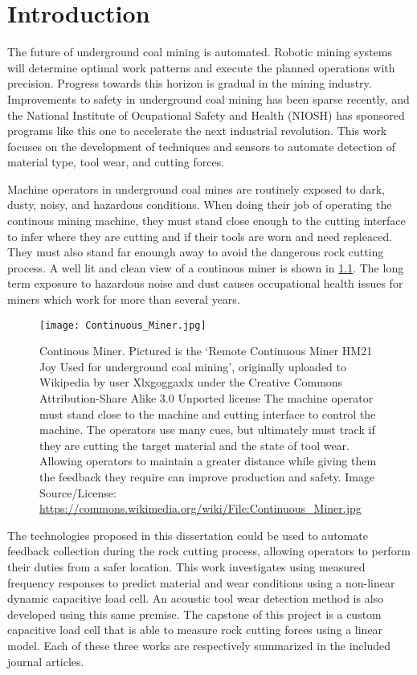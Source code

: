\chapter{Introduction}\label{chap:intro}

The future of underground coal mining is automated. 
Robotic mining systems will determine optimal work patterns and execute
the planned operations with precision.
Progress towards this horizon is gradual in the mining industry.
Improvements to safety in underground coal mining has been sparse recently,
and the National Institute of Ocupational Safety and Health (NIOSH) has sponsored
programs like this one to accelerate the next industrial revolution.
This work focuses on the development of techniques and sensors to automate detection
of material type, tool wear, and cutting forces.

Machine operators in underground coal mines are routinely exposed to dark, dusty, noisy, and
hazardous conditions. When doing their job of operating the continous mining machine,
they must stand close enough to the cutting interface to infer where they are cutting and 
if their tools are worn and need repleaced. They must also stand far enoungh away to avoid
the dangerous rock cutting process. 
A well lit and clean view of a continous miner is shown in \ref{fig:conminer}.
 The long term exposure to hazardous noise and dust causes 
occupational health issues for miners which work for more than several years.

\begin{figure}[ht]
\centering
\texttt{[image: Continuous\_Miner.jpg]}
\caption{Continous Miner. Pictured is the `Remote Continuous Miner HM21 Joy Used for underground coal mining',
 originally uploaded to Wikipedia by user Xlxgoggaxlx 
 under the Creative Commons Attribution-Share Alike 3.0 Unported license
 The machine operator must stand close to the machine and cutting interface to control the machine.
The operators use many cues, but ultimately must track if they are cutting the target material and 
the state of tool wear. Allowing operators to maintain a greater distance while giving them
the feedback they require can improve production and safety.
Image Source/License: \url{https://commons.wikimedia.org/wiki/File:Continuous_Miner.jpg}
}
\label{fig:conminer}
\end{figure}

The technologies proposed in this dissertation could be used to automate feedback collection
during the rock cutting process, allowing operators to perform their duties from a safer location.
This work investigates using measured frequency responses to predict material and wear conditions
using a non-linear dynamic capacitive load cell. 
An acoustic tool wear detection method is also developed using this same premise.
The capstone of this project is a custom capacitive load cell that is able to measure 
rock cutting forces using a linear model. 
Each of these three works are respectively summarized in the included journal articles.

